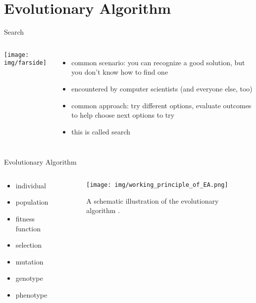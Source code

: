 \section{Evolutionary Algorithm}

\begin{frame}{Search}
  \begin{columns}
  \centering
   \texttt{[image: img/farside]}
   \begin{itemize}
      \item \alert{common scenario:} you can recognize a good solution, but you don't know how to find one
      \item encountered by computer scientists (and everyone else, too)
      \item \alert{common approach:} try different options, evaluate outcomes to help choose next options to try
       \item this is called \alert{search}    
       \end{itemize}
   \end{columns}
\end{frame}

\begin{frame}{Evolutionary Algorithm}

\begin{columns}
\begin{column}{0.25\textwidth}
\begin{itemize}
  \item individual
  \item population
  \item fitness function
  \item selection
  \item mutation
  \item genotype
  \item phenotype
\end{itemize}
\end{column}
\begin{column}{0.75\textwidth}
\begin{figure}
  \texttt{[image: img/working\_principle\_of\_EA.png]}
  \captionsetup{singlelinecheck=off,justification=raggedright}
  \caption{A schematic illustration of the evolutionary algorithm \cite[Figure 1]{Prothmann2009EvolutionaryOptimisation}.}
\end{figure}
\end{column}
\end{columns}
    
\end{frame}


